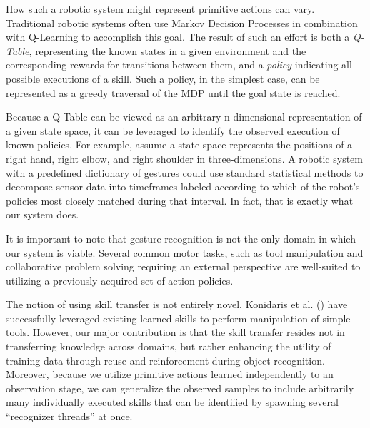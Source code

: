 \documentclass[letterpaper]{article}
\begin{document}
  How such a robotic system might represent primitive actions can vary.  Traditional robotic systems often use Markov Decision Processes in combination with Q-Learning to accomplish this goal.  The result of such an effort is both a \textit{Q-Table}, representing the known states in a given environment and the corresponding rewards for transitions between them, and a \textit{policy} indicating all possible executions of a skill.  Such a policy, in the simplest case, can be represented as a greedy traversal of the MDP until the goal state is reached.

  Because a Q-Table can be viewed as an arbitrary n-dimensional representation of a given state space, it can be leveraged to identify the observed execution of known policies.  For example, assume a state space represents the positions of a right hand, right elbow, and right shoulder in three-dimensions.  A robotic system with a predefined dictionary of gestures could use standard statistical methods to decompose sensor data into timeframes labeled according to which of the robot's policies most closely matched during that interval.  In fact, that is exactly what our system does.

  It is important to note that gesture recognition is not the only domain in which our system is viable.  Several common motor tasks, such as tool manipulation and collaborative problem solving requiring an external perspective \cite{HRITraftonPerspective} are well-suited to utilizing a previously acquired set of action policies.

  The notion of using skill transfer is not entirely novel.  Konidaris et al. (\citeyear{AutoSkillAcquisition}) have successfully leveraged existing learned skills to perform manipulation of simple tools. However, our major contribution is that the skill transfer resides not in transferring knowledge across domains, but rather enhancing the utility of training data through reuse and reinforcement during object recognition. Moreover, because we utilize primitive actions learned independently to an observation stage, we can generalize the observed samples to include arbitrarily many individually executed skills that can be identified by spawning several ``recognizer threads'' at once.
\end{document}
